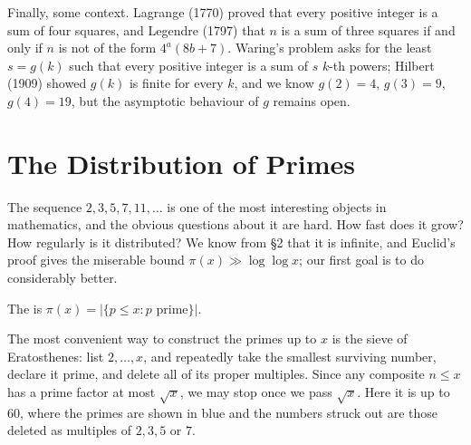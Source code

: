 Finally, some context. Lagrange (1770) proved that every positive integer is a sum of four squares, and Legendre (1797) that $n$ is a sum of three squares if and only if $n$ is not of the form $4^a(8b+7)$. Waring's problem asks for the least $s = g(k)$ such that every positive integer is a sum of $s$ $k$-th powers; Hilbert (1909) showed $g(k)$ is finite for every $k$, and we know $g(2) = 4$, $g(3) = 9$, $g(4) = 19$, but the asymptotic behaviour of $g$ remains open.

\section{The Distribution of Primes}

The sequence $2, 3, 5, 7, 11, \dots$ is one of the most interesting objects in mathematics, and the obvious questions about it are hard. How fast does it grow? How regularly is it distributed? We know from \S2 that it is infinite, and Euclid's proof gives the miserable bound $\pi(x) \gg \log\log x$; our first goal is to do considerably better.

\begin{definition}
	The  is $\pi(x) = |\{p \leq x : p \text{ prime}\}|$.
\end{definition}

The most convenient way to construct the primes up to $x$ is the sieve of Eratosthenes: list $2, \dots, x$, and repeatedly take the smallest surviving number, declare it prime, and delete all of its proper multiples. Since any composite $n \leq x$ has a prime factor at most $\sqrt x$, we may stop once we pass $\sqrt x$. Here it is up to $60$, where the primes are shown in blue and the numbers struck out are those deleted as multiples of $2, 3, 5$ or $7$.

\begin{center}
\end{center}


